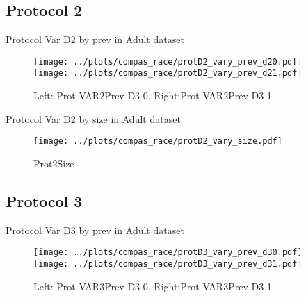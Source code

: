 \documentclass[10pt,a4paper]{article}
\begin{document}
\clearpage
\newpage
\subsection{Protocol 2}

\begin{table}[h!]
\small

\caption{Protocol Var D2 by prev in Adult dataset}
\end{table}

\begin{figure}[h!]
\texttt{[image: ../plots/compas\_race/protD2\_vary\_prev\_d20.pdf]}
\texttt{[image: ../plots/compas\_race/protD2\_vary\_prev\_d21.pdf]}
\caption{Left: Prot VAR2Prev D3-0, Right:Prot VAR2Prev D3-1}
\end{figure}

\begin{table}[h!]
\small

\caption{Protocol Var D2 by size in Adult dataset}
\end{table}

\begin{figure}[h!]
\center
\texttt{[image: ../plots/compas\_race/protD2\_vary\_size.pdf]}
\caption{Prot2Size}
\end{figure}

\clearpage
\newpage
\subsection{Protocol 3}

\begin{table}[h!]
\small

\caption{Protocol Var D3 by prev in Adult dataset}
\end{table}

\begin{figure}[h!]
\texttt{[image: ../plots/compas\_race/protD3\_vary\_prev\_d30.pdf]}
\texttt{[image: ../plots/compas\_race/protD3\_vary\_prev\_d31.pdf]}
\caption{Left: Prot VAR3Prev D3-0, Right:Prot VAR3Prev D3-1}
\end{figure}
\end{document}
